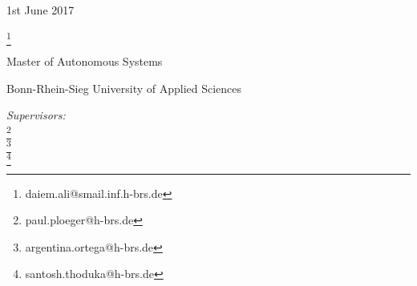 \begin{titlepage}
\centering
\vspace*{1in}
\begin{LARGE}\bfseries
\PaperSubject \par
\end{LARGE}
\PaperTitle\par
\vspace{0.5in}
1st June 2017\\
\vspace{1.5in}
\begin{Large}
\href{\PaperMainWriterEMail}{\PaperMainWriter \footnote{\href{\PaperMainWriterEMail} {daiem.ali@smail.inf.h-brs.de}}
} \par
\end{Large}
\vfill
\vspace{0.5in}
Master of Autonomous Systems
\par
Bonn-Rhein-Sieg University of Applied Sciences
\par
\vspace{0.5in}
\par
\emph{Supervisors:}\\
\href{\PaperLecturerEMail}{\PaperLecturer \footnote{\href{\PaperLecturerEMail} {paul.ploeger@h-brs.de}}}\\
\href{\SecondSupervisorEMail}{\SecondSupervisor \footnote{\href{\SecondSupervisorEMail} {argentina.ortega@h-brs.de}}}\\
\href{\ThirdSupervisorEMail}{\ThirdSupervisor \footnote{\href{\ThirdSupervisorEMail} {santosh.thoduka@h-brs.de}}}
\vfill
\end{titlepage}
